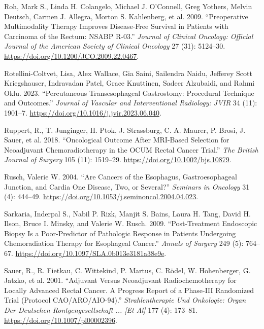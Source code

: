 \documentclass[
  letterpaper,
]{scrbook}
\newlength{\cslhangindent}
\newenvironment{CSLReferences}[2] %
 {\begin{list}{}{%
  \setlength{\itemindent}{0pt}
  \setlength{\leftmargin}{0pt}
  \setlength{\parsep}{0pt}
  \ifodd #1
   \setlength{\leftmargin}{\cslhangindent}
   \setlength{\itemindent}{-1\cslhangindent}
  \fi
  \setlength{\itemsep}{#2\baselineskip}}}
 {\end{list}}
\begin{document}
\begin{CSLReferences}{1}{0}
Roh, Mark S., Linda H. Colangelo, Michael J. O'Connell, Greg Yothers,
Melvin Deutsch, Carmen J. Allegra, Morton S. Kahlenberg, et al. 2009.
{``Preoperative Multimodality Therapy Improves Disease-Free Survival in
Patients with Carcinoma of the Rectum: {NSABP} {R}-03.''} \emph{Journal
of Clinical Oncology: Official Journal of the American Society of
Clinical Oncology} 27 (31): 5124--30.
\url{https://doi.org/10.1200/JCO.2009.22.0467}.

Rotellini-Coltvet, Lisa, Alex Wallace, Gia Saini, Sailendra Naidu,
Jefferey Scott Kriegshauser, Indravadan Patel, Grace Knuttinen, Sadeer
Alzubaidi, and Rahmi Oklu. 2023. {``Percutaneous {Transesophageal}
{Gastrostomy}: {Procedural} {Technique} and {Outcomes}.''} \emph{Journal
of Vascular and Interventional Radiology: JVIR} 34 (11): 1901--7.
\url{https://doi.org/10.1016/j.jvir.2023.06.040}.

Ruppert, R., T. Junginger, H. Ptok, J. Strassburg, C. A. Maurer, P.
Brosi, J. Sauer, et al. 2018. {``Oncological Outcome After {MRI}-Based
Selection for Neoadjuvant Chemoradiotherapy in the {OCUM} {Rectal}
{Cancer} {Trial}.''} \emph{The British Journal of Surgery} 105 (11):
1519--29. \url{https://doi.org/10.1002/bjs.10879}.

Rusch, Valerie W. 2004. {``Are Cancers of the Esophagus,
Gastroesophageal Junction, and Cardia One Disease, Two, or Several?''}
\emph{Seminars in Oncology} 31 (4): 444--49.
\url{https://doi.org/10.1053/j.seminoncol.2004.04.023}.

Sarkaria, Inderpal S., Nabil P. Rizk, Manjit S. Bains, Laura H. Tang,
David H. Ilson, Bruce I. Minsky, and Valerie W. Rusch. 2009.
{``Post-Treatment Endoscopic Biopsy Is a Poor-Predictor of Pathologic
Response in Patients Undergoing Chemoradiation Therapy for Esophageal
Cancer.''} \emph{Annals of Surgery} 249 (5): 764--67.
\url{https://doi.org/10.1097/SLA.0b013e3181a38e9e}.

Sauer, R., R. Fietkau, C. Wittekind, P. Martus, C. Rödel, W.
Hohenberger, G. Jatzko, et al. 2001. {``Adjuvant Versus Neoadjuvant
Radiochemotherapy for Locally Advanced Rectal Cancer. {A} Progress
Report of a Phase-{III} Randomized Trial (Protocol
{CAO}/{ARO}/{AIO}-94).''} \emph{Strahlentherapie Und Onkologie: Organ
Der Deutschen Rontgengesellschaft ... {[}Et Al{]}} 177 (4): 173--81.
\url{https://doi.org/10.1007/pl00002396}.


\end{CSLReferences}
\end{document}
